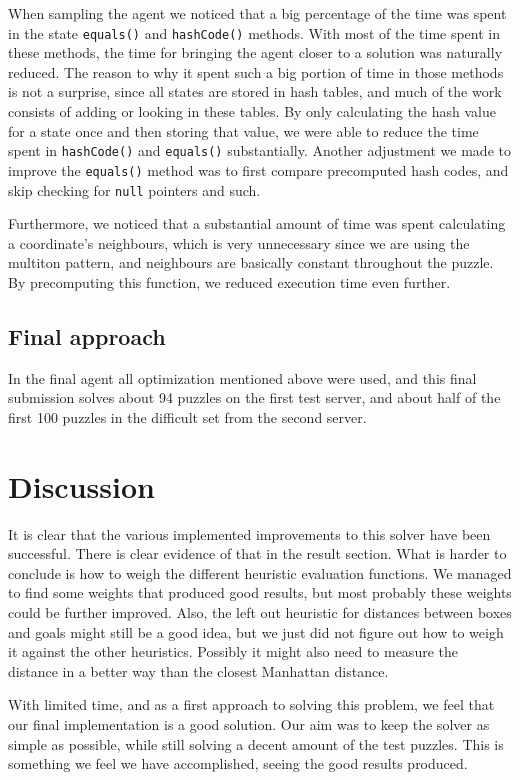 \documentclass[a4paper,11pt]{article}
\begin{document}
When sampling the agent we noticed that a big percentage of the time was spent in the state \verb!equals()! and \verb!hashCode()! methods. 
With most of the time spent in these methods, the time for bringing the agent closer to a solution
was naturally reduced.
The reason to why it spent such a big portion of time in those methods is not a surprise,
since all states are stored in hash tables, and much of the work consists of
adding or looking in these tables.
By only calculating the hash value for a state once and then storing that value,
we were able to reduce the time spent in \verb!hashCode()! and \verb!equals()! substantially.
Another adjustment we made to improve the \verb!equals()! method was to first compare precomputed hash codes,
and skip checking for \verb!null! pointers and such.

Furthermore, we noticed that a substantial amount of time was spent calculating
a coordinate's neighbours, which is very unnecessary since
we are using the multiton pattern, and neighbours are basically constant throughout the puzzle.
By precomputing this function, we reduced execution time even further.

\subsection{Final approach}
In the final agent all optimization mentioned above were used,
and this final submission solves about 94 puzzles on the first test server,
and about half of the first 100 puzzles in the difficult set from the second server.

\section{Discussion}

It is clear that the various implemented improvements to this solver have been successful.
There is clear evidence of that in the result section.
What is harder to conclude is how to weigh the different heuristic evaluation functions.
We managed to find some weights that produced good results,
but most probably these weights could be further improved.
Also, the left out heuristic for distances between boxes and goals might still be a good idea,
but we just did not figure out how to weigh it against the other heuristics.
Possibly it might also need to measure the distance in a better way than the closest Manhattan distance.

With limited time, and as a first approach to solving this problem,
we feel that our final implementation is a good solution.
Our aim was to keep the solver as simple as possible,
while still solving a decent amount of the test puzzles.
This is something we feel we have accomplished,
seeing the good results produced.
\end{document}
